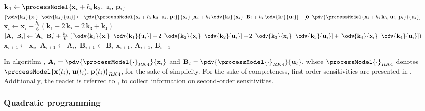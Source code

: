 \begin{algorithm}[H]
\begin{algorithmic}[1]
	\State $\mathbf{k}_4 \gets \processModel{\mathbf{x}_i + h_i\,\mathbf{k}_3,\, \mathbf{u}_i,\, \mathbf{p}_i}$
	\State $\left[\odv{\mathbf{k}_4}{\mathbf{x}_i} \hspace{0.2cm} \odv{\mathbf{k}_4}{\mathbf{u}_i}\right] \gets \pdv{\processModel{\mathbf{x}_i + h_i \, \mathbf{k}_3,\, \mathbf{u}_i,\,\mathbf{p}_i}}{\mathbf{x}_i} \left[\mathbf{A}_i + h_i \, \odv{\mathbf{k}_3}{\mathbf{x}_i} \hspace{0.2cm} \mathbf{B}_i + h_i \, \odv{\mathbf{k}_3}{\mathbf{u}_i}\right] + \left[\mathbf{0} \hspace{0.2cm} \pdv{\processModel{\mathbf{x}_i + h_i \, \mathbf{k}_3,\,\mathbf{u}_i,\,\mathbf{p}_i}}{\mathbf{u}_i}\right]$
	\State $\mathbf{x}_i \gets \mathbf{x}_i + \frac{h_i}{6} \left( \mathbf{k}_1 + 2 \, \mathbf{k}_2 + 2 \, \mathbf{k}_3 + \mathbf{k}_4 \right)$
	\State $\left[\mathbf{A}_i \hspace{0.2cm} \mathbf{B}_i\right] \gets \left[\mathbf{A}_i \hspace{0.2cm} \mathbf{B}_i\right] + \frac{h_i}{6} \, \left( \left[\odv{\mathbf{k}_1}{\mathbf{x}_i} \hspace{0.2cm} \odv{\mathbf{k}_1}{\mathbf{u}_i}\right] + 2 \, \left[\odv{\mathbf{k}_2}{\mathbf{x}_i} \hspace{0.2cm} \odv{\mathbf{k}_2}{\mathbf{u}_i}\right] + 2 \, \left[\odv{\mathbf{k}_3}{\mathbf{x}_i} \hspace{0.2cm} \odv{\mathbf{k}_3}{\mathbf{u}_i}\right] + \left[\odv{\mathbf{k}_4}{\mathbf{x}_i} \hspace{0.2cm} \odv{\mathbf{k}_4}{\mathbf{u}_i}\right] \right)$
	\EndFor
	\State $\mathbf{x}_{i+1} \gets \mathbf{x}_i,\;\mathbf{A}_{i+1} \gets \mathbf{A}_i,\;\mathbf{B}_{i+1} \gets \mathbf{B}_i$
	\State \Return $\mathbf{x}_{i+1},\,\mathbf{A}_{i+1},\,\mathbf{B}_{i+1}$
	\end{algorithmic}
\end{algorithm}

In algorithm , $\mathbf{A}_i = \pdv{\processModel{\cdot}_{RK4}}{\mathbf{x}_i}$ and $\mathbf{B}_i = \pdv{\processModel{\cdot}_{RK4}}{\mathbf{u}_i}$, where $\processModel{\cdot}_{RK4}$ denotes $\processModel{\mathbf{x}(t_i),\,\mathbf{u}(t_i),\,\mathbf{p}(t_i)}_{RK4}$, for the sake of simplicity. For the sake of completeness, first-order sensitivities are presented in . Additionally, the reader is referred to \cite{verschueren2022acados}, to collect information on second-order sensitivities.

\subsubsection*{Quadratic programming}


